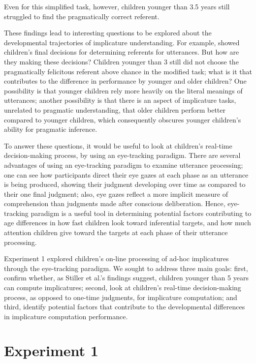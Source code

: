 \documentclass[10pt,letterpaper]{article}
\begin{document}
Even for this simplified task, however, children younger than 3.5 years still struggled to find the pragmatically correct referent. 




These findings lead to interesting questions to be explored about the developmental trajectories of implicature understanding. For example,  showed children's final decisions for determining referents for utterances. But how are they making these decisions? Children younger than 3 still did not choose the pragmatically felicitous referent above chance in the modified task; what is it that contributes to the difference in performance by younger and older children? One possibility is that younger children rely more heavily on the literal meanings of utterances; another possibility is that there is an aspect of implicature tasks, unrelated to pragmatic understanding, that older children perform better compared to younger children, which consequently obscures younger children's ability for pragmatic inference. 

To answer these questions, it would be useful to look at children's real-time decision-making process, by using an eye-tracking paradigm. There are several advantages of using an eye-tracking paradigm to examine utterance processing; one can see how participants direct their eye gazes at each phase as an utterance is being produced, showing their judgment developing over time as compared to their one final judgment; also, eye gazes reflect a more implicit measure of comprehension than judgments made after conscious deliberation. Hence, eye-tracking paradigm is a useful tool in determining potential factors contributing to age differences in how fast children look toward inferential targets, and how much attention children give toward the targets at each phase of their utterance processing.

Experiment 1 explored children's on-line processing of ad-hoc implicatures through the eye-tracking paradigm. We sought to address three main goals: first, confirm whether, as Stiller et al.'s findings suggest, children younger than 5 years can compute implicatures; second, look at children's real-time decision-making process, as opposed to one-time judgments, for implicature computation; and third, identify potential factors that contribute to the developmental differences in implicature computation performance.

\section{Experiment 1}
\end{document}
